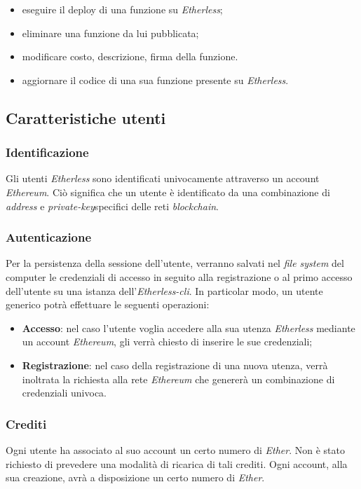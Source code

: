 \begin{itemize}
	\item eseguire il deploy di una funzione su \textit{Etherless};
	\item eliminare una funzione da lui pubblicata;
	\item modificare costo, descrizione, firma della funzione.
	\item aggiornare il codice di una sua funzione presente su \textit{Etherless}.
\end{itemize}



\subsection{Caratteristiche utenti}

\subsubsection{Identificazione}
Gli utenti \textit{Etherless} sono identificati univocamente attraverso un account \textit{Ethereum\glos}. Ciò significa che un utente è identificato da una combinazione di \textit{address} e \textit{private-key}\glo specifici delle reti \textit{blockchain\glos}.

\subsubsection{Autenticazione}
Per la persistenza della sessione dell'utente, verranno salvati nel \textit{file system\glo} del computer le credenziali di accesso in seguito alla registrazione o al primo accesso dell'utente su una istanza dell'\textit{Etherless-cli}. In particolar modo, un utente generico potrà effettuare le seguenti operazioni:
\begin{itemize}
	\item \textbf{Accesso}: nel caso l'utente voglia accedere alla sua utenza \textit{Etherless} mediante un account \textit{Ethereum\glo}, gli verrà chiesto di inserire le sue credenziali;
	\item \textbf{Registrazione}: nel caso della registrazione di una nuova utenza, verrà inoltrata la richiesta alla rete \textit{Ethereum\glo} che genererà un combinazione di credenziali univoca.
\end{itemize}
\subsubsection{Crediti}
Ogni utente ha associato al suo account un certo numero di \textit{Ether\glos}. Non è stato richiesto di prevedere una modalità di ricarica di tali crediti. Ogni account, alla sua creazione, avrà a disposizione un certo numero di \textit{Ether\glos}.

